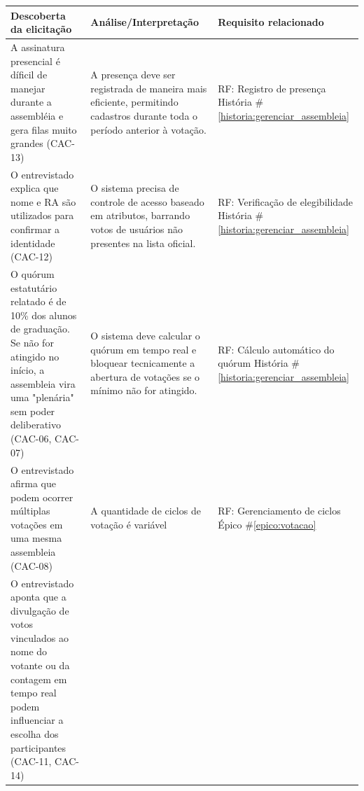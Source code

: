 \documentclass[12pt,a4paper]{article}
\newcounter{epico}
\newcounter{historia}
\begin{document}
\begin{longtable}{|p{7cm}|p{4.5cm}|p{4.5cm}|}
    \hline
    \rowcolor[gray]{0.9}
    \textbf{Descoberta da elicitação} & \textbf{Análise/Interpretação} & \textbf{Requisito relacionado} \\
    \hline
    A assinatura presencial é díficil de manejar durante a assembléia e gera filas muito grandes (CAC-13) & 
    
    A presença deve ser registrada de maneira mais eficiente, permitindo cadastros durante toda o período anterior à votação. 
    
    & RF: Registro de presença 
    \newline \newline  História \#\ref{historia:gerenciar_assembleia}\\
    
    \hline
    O entrevistado explica que nome e RA são utilizados para confirmar a identidade (CAC-12) 
    
    & O sistema precisa de controle de acesso baseado em atributos, barrando votos de usuários não presentes na lista oficial.
    
    & RF: Verificação de elegibilidade
    \newline \newline História \#\ref{historia:gerenciar_assembleia}\\
    
    \hline
    O quórum estatutário relatado é de 10\% dos alunos de graduação. Se não for atingido no início, a assembleia vira uma "plenária" sem poder deliberativo (CAC-06, CAC-07)
    
    & O sistema deve calcular o quórum em tempo real e bloquear tecnicamente a abertura de votações se o mínimo não for atingido.
    
    & RF: Cálculo automático do quórum   
    \newline \newline História \#\ref{historia:gerenciar_assembleia}\\
    
    \hline
    O entrevistado afirma que podem ocorrer múltiplas votações em uma mesma assembleia (CAC-08)
    
    &A quantidade de ciclos de votação é variável 
    
    & RF: Gerenciamento de ciclos
    \newline \newline Épico \#\ref{epico:votacao}\\
    \hline
    O entrevistado aponta que a divulgação de votos vinculados ao nome do votante ou da contagem em tempo real podem influenciar a escolha dos participantes (CAC-11, CAC-14)
    

\end{longtable}
\end{document}
